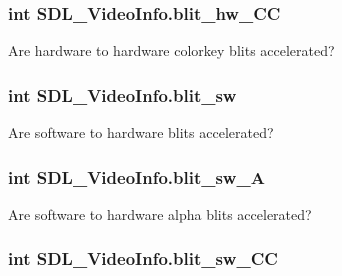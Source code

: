 \hypertarget{struct_s_d_l___video_info_a7d3127063b8bcf4efa255e7c9f542dec}{
\subsubsection[{blit\_\-hw\_\-CC}]{\setlength{\rightskip}{0pt plus 5cm}int SDL\_\-VideoInfo.blit\_\-hw\_\-CC}}
\label{struct_s_d_l___video_info_a7d3127063b8bcf4efa255e7c9f542dec}


Are hardware to hardware colorkey blits accelerated? 

\hypertarget{struct_s_d_l___video_info_aaabd96024f78511efcbec4ed3a4e2fd0}{
\subsubsection[{blit\_\-sw}]{\setlength{\rightskip}{0pt plus 5cm}int SDL\_\-VideoInfo.blit\_\-sw}}
\label{struct_s_d_l___video_info_aaabd96024f78511efcbec4ed3a4e2fd0}


Are software to hardware blits accelerated? 

\hypertarget{struct_s_d_l___video_info_ad6560a3d91a5b966e920da055dbb2ba7}{
\subsubsection[{blit\_\-sw\_\-A}]{\setlength{\rightskip}{0pt plus 5cm}int SDL\_\-VideoInfo.blit\_\-sw\_\-A}}
\label{struct_s_d_l___video_info_ad6560a3d91a5b966e920da055dbb2ba7}


Are software to hardware alpha blits accelerated? 

\hypertarget{struct_s_d_l___video_info_a09f1ba992b0b49ab10764fbebf9efc30}{
\subsubsection[{blit\_\-sw\_\-CC}]{\setlength{\rightskip}{0pt plus 5cm}int SDL\_\-VideoInfo.blit\_\-sw\_\-CC}}
\label{struct_s_d_l___video_info_a09f1ba992b0b49ab10764fbebf9efc30}


